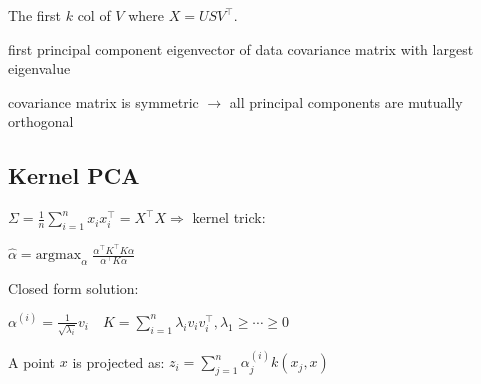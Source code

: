 \begin{compactitem}
	\item The first $k$ col of $V$ where $X = U S V^\top$.
	\item first principal component eigenvector of data covariance matrix with largest eigenvalue
	\item covariance matrix is symmetric $\rightarrow$ all principal components are mutually orthogonal
\end{compactitem}	


\subsection*{Kernel PCA}

$\Sigma = \frac{1}{n} \sum_{i=1}^n x_i x_i^\top = X^\top X \Rightarrow$  kernel trick:

\qquad \qquad $\hat{\alpha} = \text{argmax}_\alpha \; \frac{\alpha^\top K^\top K \alpha}{\alpha^\top K \alpha}$

Closed form solution:

$\alpha^{(i)} = \frac{1}{\sqrt{\lambda_i}}v_i \quad K = \sum_{i = 1}^n \lambda_i v_i v_i^\top, \lambda_1 \geq \cdots \geq 0$

A point $x$ is projected as:
$z_i = \sum_{j=1}^n \alpha_j^{(i)} k(x_j, x)$

